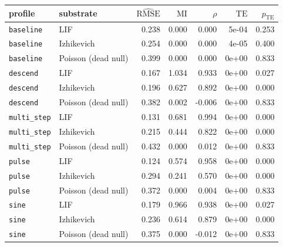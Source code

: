 \begin{tabular}{llrrrrr}
\toprule
profile & substrate & $\widehat{\mathrm{RMSE}}$ & $\mathrm{MI}$ & $\rho$ & $\mathrm{TE}$ & $p_{\mathrm{TE}}$ \\
\midrule
\texttt{baseline} & LIF & 0.238 & 0.000 & 0.000 & 5e-04 & 0.253 \\
\texttt{baseline} & Izhikevich & 0.254 & 0.000 & 0.000 & 4e-05 & 0.400 \\
\texttt{baseline} & Poisson (dead null) & 0.399 & 0.000 & 0.000 & 0e+00 & 0.833 \\
\texttt{descend} & LIF & 0.167 & 1.034 & 0.933 & 0e+00 & 0.027 \\
\texttt{descend} & Izhikevich & 0.196 & 0.627 & 0.892 & 0e+00 & 0.000 \\
\texttt{descend} & Poisson (dead null) & 0.382 & 0.002 & -0.006 & 0e+00 & 0.833 \\
\texttt{multi\_step} & LIF & 0.131 & 0.681 & 0.994 & 0e+00 & 0.000 \\
\texttt{multi\_step} & Izhikevich & 0.215 & 0.444 & 0.822 & 0e+00 & 0.000 \\
\texttt{multi\_step} & Poisson (dead null) & 0.432 & 0.000 & 0.012 & 0e+00 & 0.833 \\
\texttt{pulse} & LIF & 0.124 & 0.574 & 0.958 & 0e+00 & 0.000 \\
\texttt{pulse} & Izhikevich & 0.294 & 0.241 & 0.570 & 0e+00 & 0.000 \\
\texttt{pulse} & Poisson (dead null) & 0.372 & 0.000 & 0.004 & 0e+00 & 0.833 \\
\texttt{sine} & LIF & 0.179 & 0.966 & 0.938 & 0e+00 & 0.027 \\
\texttt{sine} & Izhikevich & 0.236 & 0.614 & 0.879 & 0e+00 & 0.000 \\
\texttt{sine} & Poisson (dead null) & 0.375 & 0.000 & -0.012 & 0e+00 & 0.833 \\
\bottomrule
\end{tabular}
